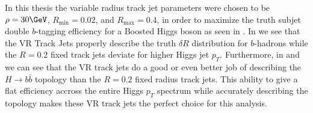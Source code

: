 In this thesis the variable radius track jet parameters were chosen to be $\rho
= 30\GeV$, $R_{\text{min}}=0.02$, and $R_{\text{max}}=0.4$, in order to
maximize the truth subjet double $b$-tagging efficiency for a Boosted Higgs
boson \cite{ATL-PHYS-PUB-2017-010} as seen in .  In
 we see that the VR Track Jets properly
describe the truth $\delta R$ distribution for $b$-hadrons while the $R=0.2$
fixed track jets deviate for higher Higgs jet $p_{T}$.  Furthermore, in
 and  we can see
that the VR track jets do a good or even better job of describing the $H
\rightarrow b\bar{b}$ topology than the $R=0.2$ fixed radius track jets.  This
ability to give a flat efficiency accross the entire Higgs $p_{T}$ spectrum
while accurately describing the topology makes these VR track jets the perfect
choice for this analysis.

